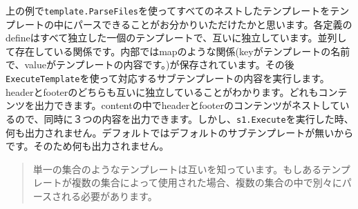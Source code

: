 上の例で\texttt{template.ParseFiles}を使ってすべてのネストしたテンプレートをテンプレートの中にパースできることがお分かりいただけたかと思います。各定義の{{define}}はすべて独立した一個のテンプレートで、互いに独立しています。並列して存在している関係です。内部ではmapのような関係(keyがテンプレートの名前で、valueがテンプレートの内容です。)が保存されています。その後\texttt{ExecuteTemplate}を使って対応するサブテンプレートの内容を実行します。headerとfooterのどちらも互いに独立していることがわかります。どれもコンテンツを出力できます。contentの中でheaderとfooterのコンテンツがネストしているので、同時に３つの内容を出力できます。しかし、\texttt{s1.Execute}を実行した時、何も出力されません。デフォルトではデフォルトのサブテンプレートが無いからです。そのため何も出力されません。

\begin{quote}
単一の集合のようなテンプレートは互いを知っています。もしあるテンプレートが複数の集合によって使用された場合、複数の集合の中で別々にパースされる必要があります。
\end{quote}
